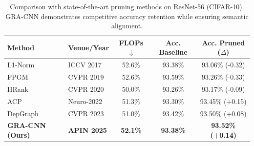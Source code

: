 \begin{table}[ht]
\centering
\caption{Comparison with state-of-the-art pruning methods on ResNet-56 (CIFAR-10). GRA-CNN demonstrates competitive accuracy retention while ensuring semantic alignment.}
\label{tab:sota}
\begin{tabular}{llccc}
\toprule
Method & Venue/Year & FLOPs $\downarrow$ & Acc. Baseline & Acc. Pruned ($\Delta$) \\
\midrule
L1-Norm~\cite{he2017channel} & ICCV 2017 & 52.6\% & 93.38\% & 93.06\% (-0.32) \\
FPGM~\cite{he2019fpgm} & CVPR 2019 & 52.6\% & 93.59\% & 93.26\% (-0.33) \\
HRank~\cite{lin2020hrank} & CVPR 2020 & 50.0\% & 93.26\% & 93.17\% (-0.09) \\
ACP~\cite{chang2022acp} & Neuro-2022 & 51.3\% & 93.30\% & 93.45\% (+0.15) \\
DepGraph~\cite{fang2023depgraph} & CVPR 2023 & 51.0\% & 93.42\% & 93.50\% (+0.08) \\
\midrule
\textbf{GRA-CNN (Ours)} & \textbf{APIN 2025} & \textbf{52.1\%} & \textbf{93.38\%} & \textbf{93.52\% (+0.14)} \\
\bottomrule
\end{tabular}
\end{table}
